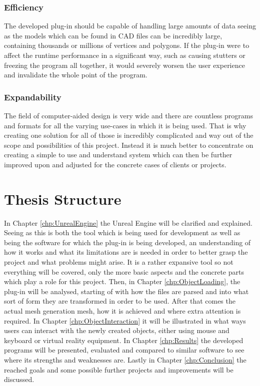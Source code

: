 \subsubsection{Efficiency} 
The developed plug-in should be capable of handling large amounts of data seeing as the models which can be found in \acs{CAD} files can be incredibly large, containing thousands or millions of vertices and polygons. If the plug-in were to affect the runtime performance in a significant way, such as causing stutters or freezing the program all together, it would severely worsen the user experience and invalidate the whole point of the program.

\subsubsection{Expandability} 
The field of computer-aided design is very wide and there are countless programs and formats for all the varying use-cases in which it is being used. That is why creating one solution for all of those is incredibly complicated and way out of the scope and possibilities of this project. Instead it is much better to concentrate on creating a simple to use and understand system which can then be further improved upon and adjusted for the concrete cases of clients or projects.

\section{Thesis Structure}
In Chapter \ref{chp:UnrealEngine} the Unreal Engine will be clarified and explained. Seeing as this is both the tool which is being used for development as well as being the software for which the plug-in is being developed, an understanding of how it works and what its limitations are is needed in order to better grasp the project and what problems might arise. It is a rather expansive tool so not everything will be covered, only the more basic aspects and the concrete parts which play a role for this project. Then, in Chapter \ref{chp:ObjectLoading}, the plug-in will be analysed, starting of with how the files are parsed and into what sort of form they are transformed in order to be used. After that comes the actual mesh generation mesh, how it is achieved and where  extra attention is required. In Chapter \ref{chp:ObjectInteraction} it will be illustrated in what ways users can interact with the newly created objects, either using mouse and keyboard or virtual reality equipment. In Chapter \ref{chp:Results} the developed programs will be presented, evaluated and compared to similar software to see where its strengths and weaknesses are. Lastly in Chapter \ref{chp:Conclusion} the reached goals and some possible further projects and improvements will be discussed.

